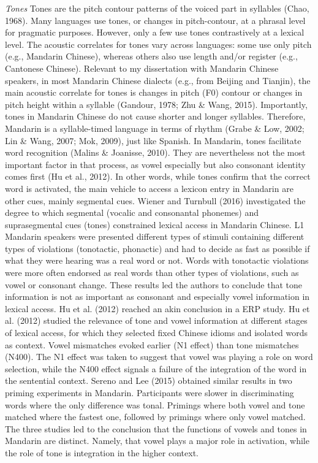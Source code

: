 \documentclass[english,man]{apa6}
\begin{document}
\emph{Tones}
Tones are the pitch contour patterns of the voiced part in syllables (Chao, 1968). Many languages use tones, or changes in pitch-contour, at a phrasal level for pragmatic purposes. However, only a few use tones contrastively at a lexical level. The acoustic correlates for tones vary across languages: some use only pitch (e.g., Mandarin Chinese), whereas others also use length and/or register (e.g., Cantonese Chinese). Relevant to my dissertation with Mandarin Chinese speakers, in most Mandarin Chinese dialects (e.g., from Beijing and Tianjin), the main acoustic correlate for tones is changes in pitch (F0) contour or changes in pitch height within a syllable (Gandour, 1978; Zhu \& Wang, 2015). Importantly, tones in Mandarin Chinese do not cause shorter and longer syllables. Therefore, Mandarin is a syllable-timed language in terms of rhythm (Grabe \& Low, 2002; Lin \& Wang, 2007; Mok, 2009), just like Spanish.
In Mandarin, tones facilitate word recognition (Malins \& Joanisse, 2010). They are nevertheless not the most important factor in that process, as vowel especially but also consonant identity comes first (Hu et al., 2012). In other words, while tones confirm that the correct word is activated, the main vehicle to access a lexicon entry in Mandarin are other cues, mainly segmental cues. Wiener and Turnbull (2016) investigated the degree to which segmental (vocalic and consonantal phonemes) and suprasegmental cues (tones) constrained lexical access in Mandarin Chinese. L1 Mandarin speakers were presented different types of stimuli containing different types of violations (tonotactic, phonactic) and had to decide as fast as possible if what they were hearing was a real word or not. Words with tonotactic violations were more often endorsed as real words than other types of violations, such as vowel or consonant change. These results led the authors to conclude that tone information is not as important as consonant and especially vowel information in lexical access. Hu et al. (2012) reached an akin conclusion in a ERP study. Hu et al. (2012) studied the relevance of tone and vowel information at different stages of lexical access, for which they selected fixed Chinese idioms and isolated words as context. Vowel mismatches evoked earlier (N1 effect) than tone mismatches (N400). The N1 effect was taken to suggest that vowel was playing a role on word selection, while the N400 effect signals a failure of the integration of the word in the sentential context. Sereno and Lee (2015) obtained similar results in two priming experiments in Mandarin. Participants were slower in discriminating words where the only difference was tonal. Primings where both vowel and tone matched where the fastest one, followed by primings where only vowel matched. The three studies led to the conclusion that the functions of vowels and tones in Mandarin are distinct. Namely, that vowel plays a major role in activation, while the role of tone is integration in the higher context.
\end{document}
